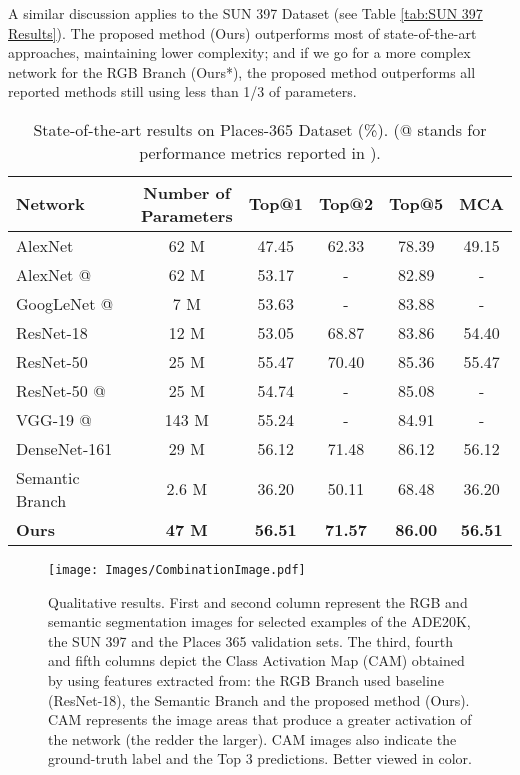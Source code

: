 \documentclass[review, 3p, sort&compress]{elsarticle}
\begin{document}
A similar discussion applies to the SUN 397 Dataset (see Table \ref{tab:SUN 397 Results}). The proposed method (Ours) outperforms most of state-of-the-art approaches, maintaining lower complexity; and if we go for a more complex network for the RGB Branch (Ours*), the proposed method outperforms all reported methods still using less than 1/3 of parameters.

\begin{table}[t!]
    \begin{centering}
    \footnotesize
    \renewcommand{\arraystretch}{1.2}
    \begin{tabular}{lccccc}
        \hline 
        Network & \makecell{Number of \\ Parameters} & Top@1 & Top@2 & Top@5 & MCA\tabularnewline
        \hline 
        AlexNet &  62 M & 47.45 & 62.33 & 78.39 & 49.15\tabularnewline
        AlexNet {{@\cite{zhou2018places}}} &  62 M & 53.17 & - & 82.89 & -\tabularnewline
        GoogLeNet {{@\cite{zhou2018places}}} &  7 M & 53.63 & - & 83.88 & -\tabularnewline
        ResNet-18 &  12 M & 53.05 & 68.87 & 83.86 & 54.40\tabularnewline
        ResNet-50 &  25 M & 55.47 & 70.40 & 85.36 & 55.47\tabularnewline
        ResNet-50 {{@\cite{zhou2018places}}} &  25 M & 54.74 & - & 85.08 & -\tabularnewline
        VGG-19 {{@\cite{zhou2018places}}} &  143 M & 55.24 & - & 84.91 & -\tabularnewline
        DenseNet-161 &  29 M & 56.12 & 71.48 & 86.12 & 56.12\tabularnewline
        \hline 
        Semantic Branch &  2.6 M & 36.20 & 50.11 & 68.48 & 36.20\tabularnewline
        \textbf{Ours} & \textbf{ 47 M} & \textbf{56.51} & \textbf{71.57} & \textbf{86.00} & \textbf{56.51}\tabularnewline
        \hline 
    \end{tabular}
    \caption{State-of-the-art results on Places-365 Dataset (\%). ({@\cite{zhou2018places}} stands for performance metrics reported in \cite{zhou2018places}).}
    \label{tab:Places365 Results}
    \par\end{centering}
\end{table}

\begin{figure*}[t!]
    \centering
    \texttt{[image: Images/CombinationImage.pdf]}
    \caption{Qualitative results. First and second column represent the RGB and semantic segmentation images for selected examples of the ADE20K, the SUN 397 and the Places 365 validation sets. The third, fourth and fifth columns depict the Class Activation Map (CAM) \cite{zhou2015cnnlocalization} obtained by using features extracted from: the RGB Branch used baseline (ResNet-18), the Semantic Branch and the proposed method (Ours). CAM represents the image areas that produce a greater activation of the network (the redder the larger). CAM images also indicate the ground-truth label and the Top 3 predictions. Better viewed in color.}
    \label{fig:Qualitvate Attention Maps}
\end{figure*}
\end{document}
